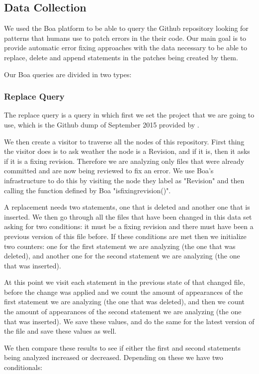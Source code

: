 \documentclass{sig-alternate-05-2015}
\begin{document}
\subsection{Data Collection}
We used the Boa platform \cite{robert} to be able to query the Github repository looking for patterns that humans use to patch errors in the their code. Our main goal is to provide automatic error fixing approaches with the data necessary to be able to replace, delete and append statements in the patches being created by them.
 
Our Boa queries are divided in two types:

\subsubsection{Replace Query}
The replace query is a query in which first we set the project that we are going to use, which is the Github dump of September 2015 provided by \cite{robert}. 

We then create a visitor to traverse all the nodes of this repository. First thing the visitor does is to ask weather the node is a Revision, and if it is, then it asks if it is a fixing revision. Therefore we are analyzing only files that were already committed and are now being reviewed to fix an error. We use Boa's infrastructure to do this by visiting the node they label as "Revision" and then calling the function defined by Boa "isfixingrevision()".

A replacement needs two statements, one that is deleted and another one that is inserted.
We then go through all the files that have been changed in this data set asking for two conditions: it must be a fixing revision and there must have been a previous version of this file before. If these conditions are met then we initialize two counters: one for the first statement we are analyzing (the one that was deleted), and another one for the second statement we are analyzing (the one that was inserted). 

At this point we visit each statement in the previous state of that changed file, before the change was applied and we count the amount of appearances of the first statement we are analyzing (the one that was deleted), and then we count the amount of appearances of the second statement we are analyzing (the one that was inserted). We save these values, and do the same for the latest version of the file and save these values as well. 

We then compare these results to see if either the first and second statements being analyzed increased or decreased. Depending on these we have two conditionals:
\end{document}
